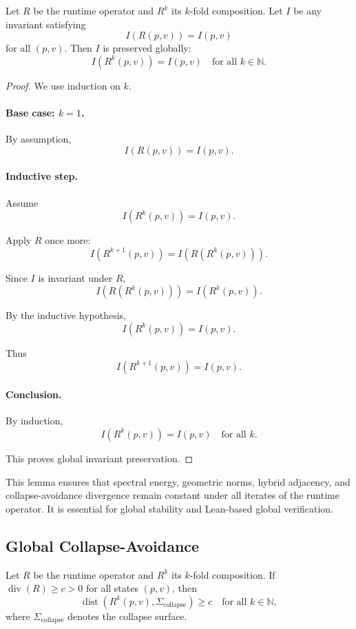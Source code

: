 \begin{lemma}
Let $R$ be the runtime operator and $R^k$ its $k$-fold composition.
Let $I$ be any invariant satisfying
\[
I(R(p,v)) = I(p,v)
\]
for all $(p,v)$.
Then $I$ is preserved globally:
\[
I(R^k(p,v)) = I(p,v)
\quad\text{for all } k \in \mathbb{N}.
\]
\end{lemma}

\begin{proof}
We use induction on $k$.

\paragraph{Base case: $k = 1$.}
By assumption,
\[
I(R(p,v)) = I(p,v).
\]

\paragraph{Inductive step.}
Assume
\[
I(R^k(p,v)) = I(p,v).
\]

Apply $R$ once more:
\[
I(R^{k+1}(p,v))
=
I(R(R^k(p,v))).
\]

Since $I$ is invariant under $R$,
\[
I(R(R^k(p,v)))
=
I(R^k(p,v)).
\]

By the inductive hypothesis,
\[
I(R^k(p,v)) = I(p,v).
\]

Thus
\[
I(R^{k+1}(p,v)) = I(p,v).
\]

\paragraph{Conclusion.}
By induction,
\[
I(R^k(p,v)) = I(p,v)
\quad\text{for all } k.
\]

This proves global invariant preservation.
\end{proof}

\begin{remark}
This lemma ensures that spectral energy, geometric norms, hybrid adjacency,
and collapse-avoidance divergence remain constant under all iterates of the
runtime operator. It is essential for global stability and Lean-based
global verification.
\end{remark}

\subsection{Global Collapse-Avoidance}

\begin{lemma}
Let $R$ be the runtime operator and $R^k$ its $k$-fold composition.
If $\operatorname{div}(R) \ge c > 0$ for all states $(p,v)$, then
\[
\operatorname{dist}(R^k(p,v), \Sigma_{\mathrm{collapse}}) \ge c
\quad\text{for all } k \in \mathbb{N},
\]
where $\Sigma_{\mathrm{collapse}}$ denotes the collapse surface.
\end{lemma}

